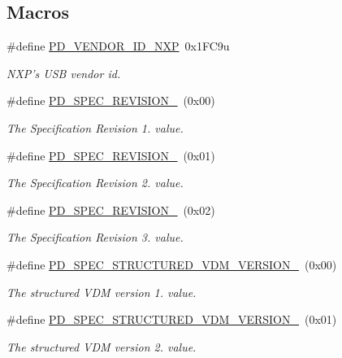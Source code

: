 \subsection*{Macros}
\begin{DoxyCompactItemize}
\item 
\#define \hyperlink{group__usb__pd__stack_gab5c70518a449d87b8e044fe35f9794b9}{P\-D\-\_\-\-V\-E\-N\-D\-O\-R\-\_\-\-I\-D\-\_\-\-N\-X\-P}~0x1\-F\-C9u
\begin{DoxyCompactList}\small\item\em N\-X\-P's U\-S\-B vendor id. \end{DoxyCompactList}\item 
\#define \hyperlink{group__usb__pd__stack_ga647e3cd4fd452c4c8087331f7cff40e0}{P\-D\-\_\-\-S\-P\-E\-C\-\_\-\-R\-E\-V\-I\-S\-I\-O\-N\-\_}~(0x00)
\begin{DoxyCompactList}\small\item\em The Specification Revision 1. value. \end{DoxyCompactList}\item 
\#define \hyperlink{group__usb__pd__stack_ga24966fea2a4e7d202653403ffb4dc4a4}{P\-D\-\_\-\-S\-P\-E\-C\-\_\-\-R\-E\-V\-I\-S\-I\-O\-N\-\_}~(0x01)
\begin{DoxyCompactList}\small\item\em The Specification Revision 2. value. \end{DoxyCompactList}\item 
\#define \hyperlink{group__usb__pd__stack_ga4be9f8c2d24914f46c855883891789e0}{P\-D\-\_\-\-S\-P\-E\-C\-\_\-\-R\-E\-V\-I\-S\-I\-O\-N\-\_}~(0x02)
\begin{DoxyCompactList}\small\item\em The Specification Revision 3. value. \end{DoxyCompactList}\item 
\#define \hyperlink{group__usb__pd__stack_ga90a8413b96e40227291a5243a7d70bc1}{P\-D\-\_\-\-S\-P\-E\-C\-\_\-\-S\-T\-R\-U\-C\-T\-U\-R\-E\-D\-\_\-\-V\-D\-M\-\_\-\-V\-E\-R\-S\-I\-O\-N\-\_}~(0x00)
\begin{DoxyCompactList}\small\item\em The structured V\-D\-M version 1. value. \end{DoxyCompactList}\item 
\#define \hyperlink{group__usb__pd__stack_ga459e2031557c359d23fc2ae926c1f42d}{P\-D\-\_\-\-S\-P\-E\-C\-\_\-\-S\-T\-R\-U\-C\-T\-U\-R\-E\-D\-\_\-\-V\-D\-M\-\_\-\-V\-E\-R\-S\-I\-O\-N\-\_}~(0x01)
\begin{DoxyCompactList}\small\item\em The structured V\-D\-M version 2. value. \end{DoxyCompactList}\item 

\end{DoxyCompactItemize}
